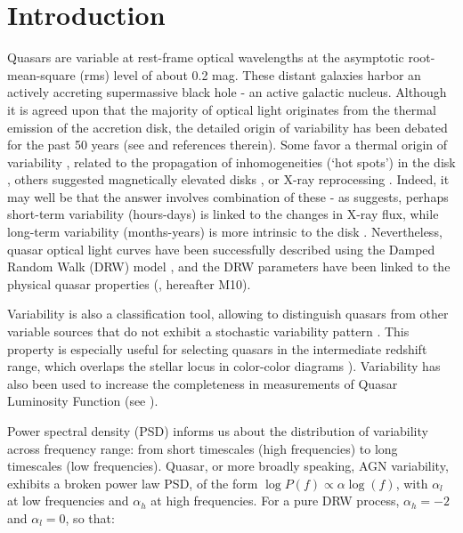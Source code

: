 \documentclass[twocolumn]{aastex62}
\begin{document}

\section{Introduction}

Quasars are variable at rest-frame optical wavelengths at the asymptotic root-mean-square (rms) level of about 0.2 mag. These distant galaxies harbor an actively accreting supermassive black hole - an active galactic nucleus. Although it is agreed upon that the majority of optical light originates from the thermal emission of the accretion disk, the detailed origin of variability has been debated for the past 50 years (see \citealt{sun2018} and references therein). Some favor a thermal origin of variability \citep{kelly2013}, related to the propagation of inhomogeneities (`hot spots') in the disk \citep{dexter2011, cai2016}, others suggested magnetically elevated disks \citep{dexter2019}, or X-ray reprocessing  \citep{kubota2018}.  Indeed, it may well be that the answer involves combination of these -  as \cite{sanchez2018} suggests, perhaps short-term variability (hours-days) is linked to the changes in X-ray flux, while long-term variability (months-years) is more intrinsic to the disk \citep{edelson2015,lira2015}. Nevertheless, quasar optical light curves have been successfully described using the Damped Random Walk (DRW) model \citep{kelly2009, macleod2010, kozlowski2010, zu2011, kasliwal2015a}, and the DRW parameters have been linked to the physical quasar properties (\citealt{macleod2010}, hereafter M10). 

Variability is also a classification tool, allowing to distinguish quasars from other variable sources that do not exhibit a stochastic variability pattern \citep{macleod2011}. This property is especially useful for selecting quasars in the intermediate redshift range, which overlaps the stellar locus in color-color diagrams \citep{sesar2007, yang2017}). Variability has also been used to increase the completeness in measurements of Quasar Luminosity Function (see \citealt{ ross2013, palanque2013, alsayyad2016, mcgreer2013, mcgreer2018}). 

Power spectral density (PSD) informs us about the distribution of variability across frequency range: from short timescales (high frequencies) to long timescales (low frequencies). Quasar, or more broadly speaking, AGN variability, exhibits a broken power law PSD, of the form 
$\log{P(f)} \propto \alpha \log{(f)}$, with $\alpha_l$ at low frequencies and $\alpha_h$ at high frequencies. For a pure DRW process,  $\alpha_{h}{=}-2$ and $\alpha_{l}{=}0$, so that:
\end{document}
